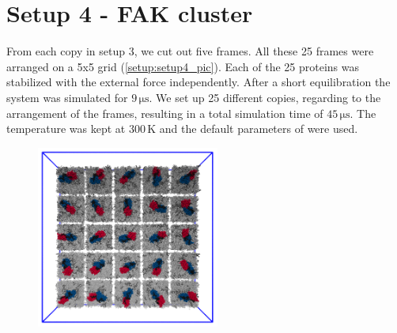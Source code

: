 \section{Setup 4 - FAK cluster}
From each copy in setup 3, we cut out five frames. All these 25 frames were arranged on a {5x5} grid (\autoref{setup:setup4_pic}). Each of the 25 proteins was stabilized with the external force independently. After a short equilibration the system was simulated for $9\,\si{\micro\second}$. We set up 25 different copies, regarding to the arrangement of the frames, resulting in a total simulation time of $45\,\si{\micro\second}$. The temperature was kept at $300\,\si{\kelvin}$ and the default parameters of \martini{} were used.
%
%
%
\begin{figure}[h]
	\centering
	\includegraphics[height=6cm]{figures/setup/setup_cluster}
	\label{setup:setup4_pic}
\end{figure}
%
%
%
